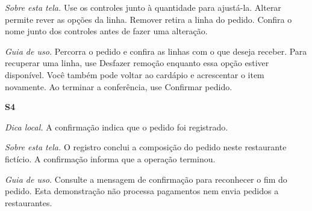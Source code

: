 \par\noindent\emph{Sobre esta tela.} Use os controles junto à quantidade para ajustá-la. Alterar permite rever as opções da linha. Remover retira a linha do pedido. Confira o nome junto dos controles antes de fazer uma alteração.
\par\noindent\emph{Guia de uso.} Percorra o pedido e confira as linhas com o que deseja receber. Para recuperar uma linha, use Desfazer remoção enquanto essa opção estiver disponível. Você também pode voltar ao cardápio e acrescentar o item novamente. Ao terminar a conferência, use Confirmar pedido.
\par\smallskip\noindent\textbf{S4}
\par\noindent\emph{Dica local.} A confirmação indica que o pedido foi registrado.
\par\noindent\emph{Sobre esta tela.} O registro conclui a composição do pedido neste restaurante fictício. A confirmação informa que a operação terminou.
\par\noindent\emph{Guia de uso.} Consulte a mensagem de confirmação para reconhecer o fim do pedido. Esta demonstração não processa pagamentos nem envia pedidos a restaurantes.
